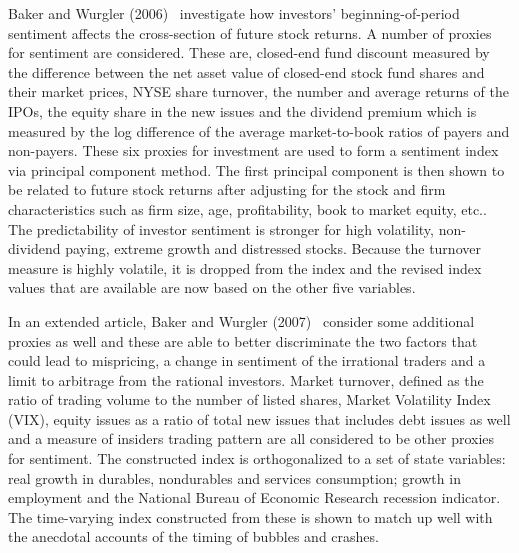  
 Baker and Wurgler (2006)~\cite{baker2006investor} investigate how investors' beginning-of-period sentiment affects the cross-section of future stock returns. A number of proxies for sentiment are considered. These are, closed-end fund discount measured by the difference between the net asset value of closed-end stock fund shares and their market prices, NYSE share turnover, the number and average returns of the IPOs, the equity share in the new issues and the dividend premium which is measured by the log difference of the average market-to-book ratios of payers and non-payers. These six proxies for investment are used to form a sentiment index via principal component method. The first principal component is then shown to be related to future stock returns after adjusting for the stock and firm characteristics such as firm size, age, profitability, book to market equity, etc.. The predictability of investor sentiment is stronger for high volatility, non-dividend paying, extreme growth and distressed stocks. Because the turnover measure is highly volatile, it is dropped from the index and the revised index values that are available are now based on the other five variables. 
 
 
In an extended article, Baker and Wurgler (2007)~\cite{baker2007investor} consider some additional proxies as well and these are able to better discriminate the two factors that could lead to mispricing, a change in sentiment of the irrational traders and a limit to arbitrage from the rational investors. Market turnover, defined as the ratio of trading volume to the number of listed shares, Market Volatility Index (VIX),\label{in:vix} equity issues as a ratio of total new issues that includes debt issues as well and a measure of insiders trading pattern are all considered to be other proxies for sentiment. The constructed index is orthogonalized to a set of state variables: real growth in durables, nondurables and services consumption; growth in employment and the National Bureau of Economic Research recession indicator. The time-varying index constructed from these is shown to match up well with the anecdotal accounts of the timing of bubbles and crashes.
 
